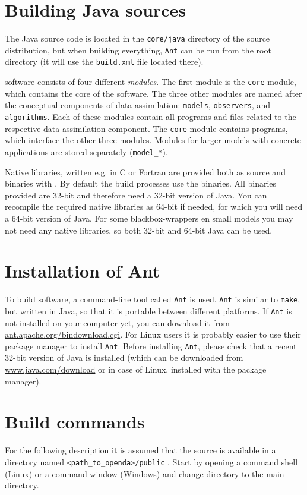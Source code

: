 \section{Building Java sources}
The \oda Java source code is located in the \verb|core/java| directory of the source distribution, but when building everything, \verb|Ant| can be run from the \oda root directory (it will use the \verb|build.xml| file located there).

\oda software consists of four different \emph{modules}. The first module is the \verb|core| module, which contains the core of the \oda software. The three other modules are named after the conceptual components of data assimilation: \verb|models|, \verb|observers|, and \verb|algorithms|. Each of these modules contain all programs and files related to the respective data-assimilation component. The \verb|core| module contains programs, which interface the other three modules. Modules for larger models with concrete applications are stored separately (\verb|model_*|).

Native libraries, written e.g. in C or Fortran are provided both as source and binaries with \oda. By default the build processes use the binaries. All binaries provided are 32-bit and therefore need a 32-bit version of Java. You can recompile the required native libraries as 64-bit if needed, for which you will need a 64-bit version of Java. For some blackbox-wrappers en small models you may not need any native libraries, so both 32-bit and 64-bit Java can be used.

\section{Installation of Ant}
To build \oda software, a command-line tool called \verb|Ant| is used. \verb|Ant| is similar to \verb|make|, but written in Java, so that it is portable between different platforms. If \verb|Ant| is not installed on your computer yet, you can download it from \href{http://ant.apache.org/bindownload.cgi}{ant.apache.org/bindownload.cgi}. For Linux users it is probably easier to use their package manager to install \verb|Ant|. Before installing \verb|Ant|, please check that a recent 32-bit version of Java is installed (which can be downloaded from \href{http://www.java.com/download}{www.java.com/download} or in case of Linux, installed with the package manager).

\section{Build commands}
For the following description it is assumed that the \oda source is available in a directory named \verb|<path_to_openda>/public| .
Start by opening a command shell (Linux) or a command window (Windows) and change directory to the \oda main directory.

